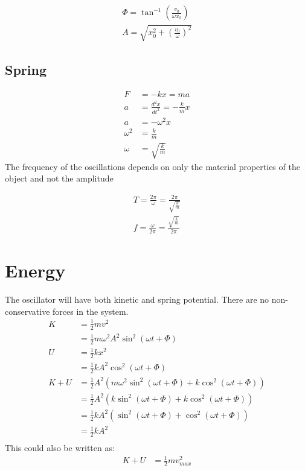 \documentclass{article}
\theoremstyle{mytheoremstyle}
\theoremstyle{mytheoremstyle}
\theoremstyle{myproblemstyle}
\begin{document}
    \begin{align*}
        \Phi = \tan^{-1}(\frac{v_0}{\omega  x_0}) \\
        A = \sqrt{x_0^2+ (\frac{v_0}{\omega})^2}
    \end{align*}

    \subsection*{Spring}

    \begin{align*}
        F &= -kx = ma \\
        a &= \frac{d^2 x}{dt^2} = -\frac{k}{m} x \\
        a &= -\omega^2 x \\
        \omega^2 &= \frac{k}{m} \\
        \omega &= \sqrt{\frac{k}{m}}
    \end{align*}
    The frequency of the oscillations depends on only the material properties of
    the object and not the amplitude

    \begin{align*}
        T = \frac{2\pi}{\omega} = \frac{2\pi}{\sqrt{\frac{k}{m}}} \\
        f = \frac{\omega}{2\pi} = \frac{\sqrt{\frac{k}{m}}}{2\pi}
    \end{align*}

    \section*{Energy}
    The oscillator will have both kinetic and spring potential. There are no
    non-conservative forces in the system.
    \begin{align*}
        K &= \frac{1}{2} mv^2 \\
        &= \frac{1}{2} m \omega^2 A^2 \sin^2(\omega t+ \Phi) \\
        U &= \frac{1}{2} kx^2 \\
        &= \frac{1}{2} kA^2 \cos^2(\omega t + \Phi) \\
        K+U &= \frac{1}{2} A^2 (m\omega^2\sin^2(\omega t + \Phi) + k \cos^2(\omega t + \Phi)) \\
        &= \frac{1}{2} A^2 (k\sin^2(\omega t + \Phi) + k \cos^2(\omega t + \Phi)) \\
        &= \frac{1}{2} kA^2 (\sin^2(\omega t + \Phi) + \cos^2(\omega t + \Phi)) \\
        &= \frac{1}{2} kA^2 \\
    \end{align*}
    This could also be written as:
    \begin{align*}
        K+U &= \frac{1}{2} mv_{max}^2
    \end{align*}
\end{document}
